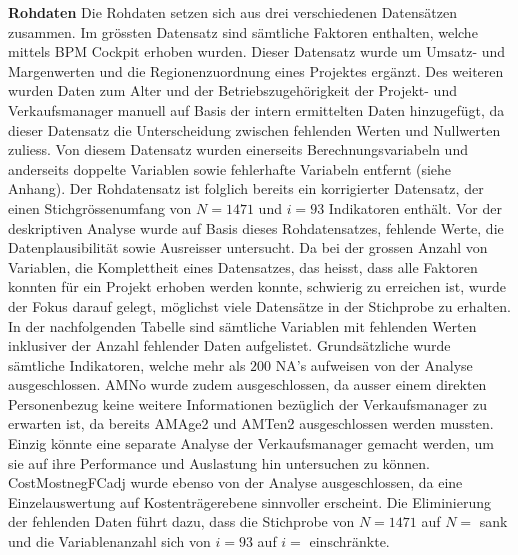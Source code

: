 \newline
\newline\textbf{Rohdaten}
\newline Die Rohdaten setzen sich aus drei verschiedenen Datensätzen zusammen. Im grössten Datensatz sind sämtliche Faktoren enthalten, welche mittels BPM Cockpit erhoben wurden. Dieser Datensatz wurde um Umsatz- und Margenwerten und die Regionenzuordnung eines Projektes ergänzt. Des weiteren wurden Daten zum Alter und der Betriebszugehörigkeit der Projekt- und Verkaufsmanager manuell auf Basis der intern ermittelten Daten hinzugefügt, da dieser Datensatz die Unterscheidung zwischen fehlenden Werten und Nullwerten zuliess. Von diesem Datensatz wurden einerseits Berechnungsvariabeln und anderseits doppelte Variablen sowie fehlerhafte Variabeln entfernt (siehe Anhang). Der Rohdatensatz ist folglich bereits ein korrigierter Datensatz, der einen Stichgrössenumfang von $N = 1471$ und $i = 93$ Indikatoren enthält. Vor der deskriptiven Analyse wurde auf Basis dieses Rohdatensatzes, fehlende Werte, die Datenplausibilität sowie Ausreisser untersucht. Da bei der grossen Anzahl von Variablen, die Komplettheit eines Datensatzes, das heisst, dass alle Faktoren konnten für ein Projekt erhoben werden konnte, schwierig zu erreichen ist, wurde der Fokus darauf gelegt, möglichst viele Datensätze in der Stichprobe zu erhalten. In der nachfolgenden Tabelle sind sämtliche Variablen mit fehlenden Werten inklusiver der Anzahl fehlender Daten aufgelistet. Grundsätzliche wurde sämtliche Indikatoren, welche mehr als $200$ NA's aufweisen von der Analyse ausgeschlossen. AMNo wurde zudem ausgeschlossen, da ausser einem direkten Personenbezug keine weitere Informationen bezüglich der Verkaufsmanager zu erwarten ist, da bereits AMAge2 und AMTen2 ausgeschlossen werden mussten. Einzig könnte eine separate Analyse der Verkaufsmanager gemacht werden, um sie auf ihre Performance und Auslastung hin untersuchen zu können. CostMostnegFCadj wurde ebenso von der Analyse ausgeschlossen, da eine Einzelauswertung auf Kostenträgerebene sinnvoller erscheint. Die Eliminierung der fehlenden Daten führt dazu, dass die Stichprobe von $N = 1471$ auf $N = $ sank und die Variablenanzahl sich von $i = 93$ auf $i = $ einschränkte.
\newline
